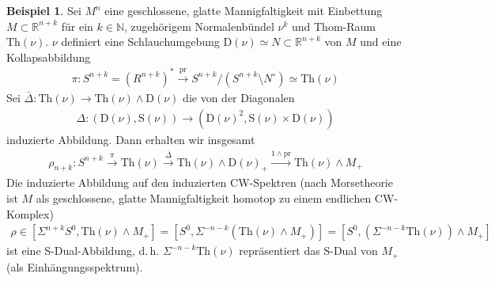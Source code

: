 \documentclass[ngerman, parskip=half]{scrartcl}
\theoremstyle{definition}
\newtheorem*{Bsp}{Beispiel}
\newcommand*{\Smash}{\ensuremath{\wedge}}
\newcommand*{\SDual}{S-Dual}
\newcommand*{\Sph}{\ensuremath{S^0}}
\newcommand*{\N}{\mathds{N}}
\newcommand*{\R}{\mathds{R}}
\newcommand*{\D}[1]{\mathrm{D}(#1)}
\newcommand*{\Th}[1]{\text{Th}(#1)}
\newcommand*{\Sb}[1]{\mathrm{S}(#1)}
\begin{document}
\begin{Bsp}
  Sei $M^n$ eine geschlossene, glatte Mannigfaltigkeit mit Einbettung
  $M\subset\R^{n+k}$ für ein $k\in\N$, zugehörigem Normalenbündel
  $\nu^k$ und Thom-Raum $\Th{\nu}$.
  $\nu$ definiert eine Schlauchumgebung
  $\D{\nu}\simeq N\subset\R^{n+k}$ von $M$ und eine Kollapsabbildung
  \begin{gather*}
    \pi\colon
    S^{n+k}=(R^{n+k})^* \overset{\text{pr}}\longrightarrow
    S^{n+k}/(S^{n+k}\setminus N^{\circ}) \simeq
    \Th{\nu}
  \end{gather*}
  Sei $\bar{\Delta}\colon \Th{\nu}\to \Th{\nu}\Smash \D{\nu}$ die
  von der Diagonalen
  \begin{gather*}
   \Delta\colon (\D{\nu},\Sb{\nu})\to (\D{\nu}^2,\Sb{\nu}\times \D{\nu}) 
  \end{gather*}
  induzierte Abbildung. Dann erhalten wir insgesamt
  \begin{gather*}
    \rho_{n+k}\colon
    S^{n+k} \overset{\pi}\longrightarrow
    \Th{\nu} \overset{\bar{\Delta}}\longrightarrow
    \Th{\nu} \Smash \D{\nu}_+ \xrightarrow{1\Smash \text{pr}}
    \Th{\nu} \Smash M_+
  \end{gather*}
  Die induzierte Abbildung auf den induzierten CW-Spektren (nach
  Morsetheorie ist $M$ als geschlossene, glatte Mannigfaltigkeit
  homotop zu einem endlichen CW-Komplex)
  \begin{gather*}
    \rho \in \left[\Sigma^{n+k}\Sph, \Th{\nu}\Smash M_+\right]
    = \left[\Sph, \Sigma^{-n-k}\left(\Th{\nu}\Smash M_+\right)\right]
    = \left[\Sph, \left(\Sigma^{-n-k}\Th{\nu}\right)\Smash M_+\right]
  \end{gather*}
  ist eine \SDual-Abbildung, d.\,h. $\Sigma^{-n-k}\Th{\nu}$
  repräsentiert das \SDual{} von $M_+$ (als Einhängungsspektrum).
\end{Bsp}

\nocite{*}
\printbibliography
\end{document}
